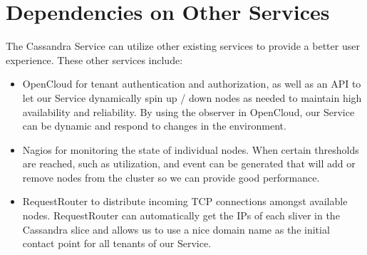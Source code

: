 \documentclass[11pt,notitlepage]{report}
\begin{document}
\chapter*{Dependencies on Other Services}

The Cassandra Service can utilize other existing services to provide a better user experience. These other services include:
\begin{itemize}
\item OpenCloud for tenant authentication and authorization, as well as an API to let our Service dynamically spin up / down nodes as needed to maintain high availability and reliability. By using the observer in OpenCloud, our Service can be dynamic and respond to changes in the environment.
\item Nagios for monitoring the state of individual nodes. When certain thresholds are reached, such as utilization, and event can be generated that will add or remove nodes from the cluster so we can provide good performance.
\item RequestRouter to distribute incoming TCP connections amongst available nodes. RequestRouter can automatically get the IPs of each sliver in the Cassandra slice and allows us to use a nice domain name as the initial contact point for all tenants of our Service.
\end{itemize}
\end{document}
